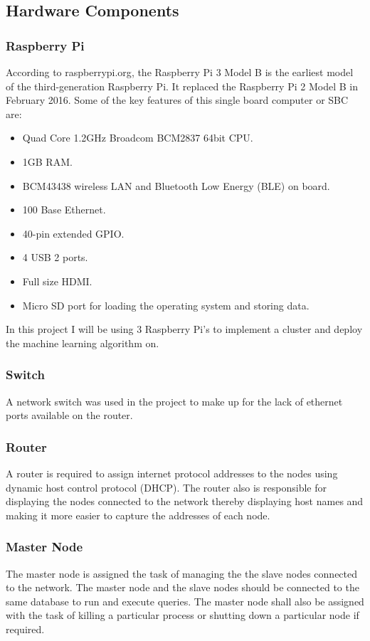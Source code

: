 \documentclass[12pt]{article}
\begin{document}
\subsection{Hardware Components}
\subsubsection{Raspberry Pi}
According to raspberrypi.org\cite{rpi}, the Raspberry Pi 3 Model B is the earliest model of the third-generation Raspberry Pi. It replaced the Raspberry Pi 2 Model B in February 2016. Some of the key features of this single board computer or SBC are:
\begin{itemize}
\item Quad Core 1.2GHz Broadcom BCM2837 64bit CPU.
\item 1GB RAM.
\item BCM43438 wireless LAN and Bluetooth Low Energy (BLE) on board.
\item 100 Base Ethernet.
\item 40-pin extended GPIO.
\item 4 USB 2 ports.
\item Full size HDMI.
\item Micro SD port for loading the operating system and storing data.
\end{itemize}
In this project I will be using 3 Raspberry Pi's to implement a cluster and deploy the machine learning algorithm on.

\subsubsection{Switch}
A network switch was used in the project to make up for the lack of ethernet ports available on the router.

\subsubsection{Router}
A router is required to assign internet protocol addresses to the nodes using dynamic host control protocol (DHCP). The router also is responsible for displaying the nodes connected to the network thereby displaying host names and making it more easier to capture the addresses of each node.

\subsubsection{Master Node}
The master node is assigned the task of managing the the slave nodes connected to the network. The master node and the slave nodes should be connected to the same database to run and execute queries. The master node shall also be assigned with the task of killing a particular process or shutting down a particular node if required.
\end{document}

